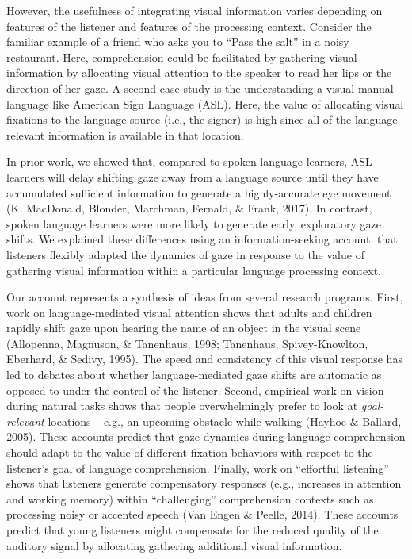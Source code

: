 \documentclass[10pt, letterpaper]{article}
\begin{document}
However, the usefulness of integrating visual information varies
depending on features of the listener and features of the processing
context. Consider the familiar example of a friend who asks you to
``Pass the salt'' in a noisy restaurant. Here, comprehension could be
facilitated by gathering visual information by allocating visual
attention to the speaker to read her lips or the direction of her gaze.
A second case study is the understanding a visual-manual language like
American Sign Language (ASL). Here, the value of allocating visual
fixations to the language source (i.e., the signer) is high since all of
the language-relevant information is available in that location.

In prior work, we showed that, compared to spoken language learners,
ASL-learners will delay shifting gaze away from a language source until
they have accumulated sufficient information to generate a
highly-accurate eye movement (K. MacDonald, Blonder, Marchman, Fernald,
\& Frank, 2017). In contrast, spoken language learners were more likely
to generate early, exploratory gaze shifts. We explained these
differences using an information-seeking account: that listeners
flexibly adapted the dynamics of gaze in response to the value of
gathering visual information within a particular language processing
context.

Our account represents a synthesis of ideas from several research
programs. First, work on language-mediated visual attention shows that
adults and children rapidly shift gaze upon hearing the name of an
object in the visual scene (Allopenna, Magnuson, \& Tanenhaus, 1998;
Tanenhaus, Spivey-Knowlton, Eberhard, \& Sedivy, 1995). The speed and
consistency of this visual response has led to debates about whether
language-mediated gaze shifts are automatic as opposed to under the
control of the listener. Second, empirical work on vision during natural
tasks shows that people overwhelmingly prefer to look at
\emph{goal-relevant} locations -- e.g., an upcoming obstacle while
walking (Hayhoe \& Ballard, 2005). These accounts predict that gaze
dynamics during language comprehension should adapt to the value of
different fixation behaviors with respect to the listener's goal of
language comprehension. Finally, work on ``effortful listening'' shows
that listeners generate compensatory responses (e.g., increases in
attention and working memory) within ``challenging'' comprehension
contexts such as processing noisy or accented speech (Van Engen \&
Peelle, 2014). These accounts predict that young listeners might
compensate for the reduced quality of the auditory signal by allocating
gathering additional visual information.
\end{document}

